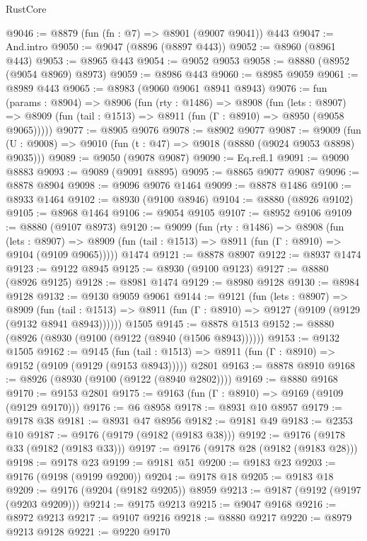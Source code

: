 \begin{lexlean}{RustCore}
\begin{coremodule}
@9046 := @8879 (fun (fn : @7) => @8901 (@9007 @9041)) @443
@9047 := And.intro
@9050 := @9047 (@8896 (@8897 @443))
@9052 := @8960 (@8961 @443)
@9053 := @8965 @443
@9054 := @9052 @9053
@9058 := @8880 (@8952 (@9054 @8969) @8973)
@9059 := @8986 @443
@9060 := @8985 @9059
@9061 := @8989 @443
@9065 := @8983 (@9060 @9061 @8941 @8943)
@9076 := fun (params : @8904) =>
  @8906
    (fun (rty : @1486) =>
    @8908
      (fun (lets : @8907) =>
      @8909 (fun (tail : @1513) => @8911 (fun (Γ : @8910) => @8950 (@9058 @9065)))))
@9077 := @8905 @9076
@9078 := @8902 @9077
@9087 := @9009 (fun (U : @9008) => @9010 (fun (t : @47) => @9018 (@8880 (@9024 @9053 @8898) @9035)))
@9089 := @9050 (@9078 @9087)
@9090 := Eq.refl.{1}
@9091 := @9090 @8883
@9093 := @9089 (@9091 @8895)
@9095 := @8865 @9077 @9087
@9096 := @8878 @8904
@9098 := @9096 @9076 @1464
@9099 := @8878 @1486
@9100 := @8933 @1464
@9102 := @8930 (@9100 @8946)
@9104 := @8880 (@8926 @9102)
@9105 := @8968 @1464
@9106 := @9054 @9105
@9107 := @8952 @9106
@9109 := @8880 (@9107 @8973)
@9120 := @9099
    (fun (rty : @1486) =>
    @8908
      (fun (lets : @8907) =>
      @8909 (fun (tail : @1513) => @8911 (fun (Γ : @8910) => @9104 (@9109 @9065)))))
    @1474
@9121 := @8878 @8907
@9122 := @8937 @1474
@9123 := @9122 @8945
@9125 := @8930 (@9100 @9123)
@9127 := @8880 (@8926 @9125)
@9128 := @8981 @1474
@9129 := @8980 @9128
@9130 := @8984 @9128
@9132 := @9130 @9059 @9061
@9144 := @9121
    (fun (lets : @8907) =>
    @8909
      (fun (tail : @1513) => @8911 (fun (Γ : @8910) => @9127 (@9109 (@9129 (@9132 @8941 @8943))))))
    @1505
@9145 := @8878 @1513
@9152 := @8880 (@8926 (@8930 (@9100 (@9122 (@8940 (@1506 @8943))))))
@9153 := @9132 @1505
@9162 := @9145
    (fun (tail : @1513) => @8911 (fun (Γ : @8910) => @9152 (@9109 (@9129 (@9153 @8943)))))
    @2801
@9163 := @8878 @8910
@9168 := @8926 (@8930 (@9100 (@9122 (@8940 @2802))))
@9169 := @8880 @9168
@9170 := @9153 @2801
@9175 := @9163 (fun (Γ : @8910) => @9169 (@9109 (@9129 @9170)))
@9176 := @6 @8958
@9178 := @8931 @10 @8957
@9179 := @9178 @38
@9181 := @8931 @47 @8956
@9182 := @9181 @49
@9183 := @2353 @10
@9187 := @9176 (@9179 (@9182 (@9183 @38)))
@9192 := @9176 (@9178 @33 (@9182 (@9183 @33)))
@9197 := @9176 (@9178 @28 (@9182 (@9183 @28)))
@9198 := @9178 @23
@9199 := @9181 @51
@9200 := @9183 @23
@9203 := @9176 (@9198 (@9199 @9200))
@9204 := @9178 @18
@9205 := @9183 @18
@9209 := @9176 (@9204 (@9182 @9205)) @8959
@9213 := @9187 (@9192 (@9197 (@9203 @9209)))
@9214 := @9175 @9213
@9215 := @9047 @9168
@9216 := @8972 @9213
@9217 := @9107 @9216
@9218 := @8880 @9217
@9220 := @8979 @9213 @9128
@9221 := @9220 @9170

\end{coremodule}
\end{lexlean}
